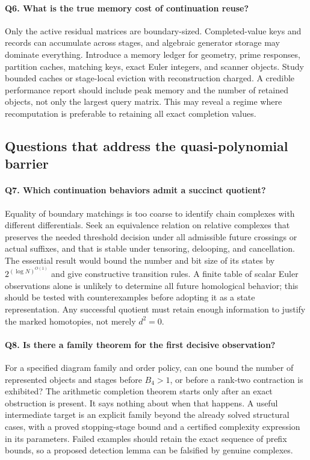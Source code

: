\paragraph{Q6. What is the true memory cost of continuation reuse?}
Only the active residual matrices are boundary-sized. Completed-value keys and
records can accumulate across stages, and algebraic generator storage may
dominate everything. Introduce a memory ledger for geometry, prime responses,
partition caches, matching keys, exact Euler integers, and scanner objects.
Study bounded caches or stage-local eviction with reconstruction charged.
A credible performance report should include peak memory and the number of
retained objects, not only the largest query matrix. This may reveal a regime
where recomputation is preferable to retaining all exact completion values.

\subsection{Questions that address the quasi-polynomial barrier}

\paragraph{Q7. Which continuation behaviors admit a succinct quotient?}
Equality of boundary matchings is too coarse to identify chain complexes with
different differentials. Seek an equivalence relation on relative complexes
that preserves the needed threshold decision under all admissible future
crossings or actual suffixes, and that is stable under tensoring, delooping,
and cancellation. The essential result would bound the number and bit size of
its states by $2^{(\log N)^{O(1)}}$ and give constructive transition rules.
A finite table of scalar Euler observations alone is unlikely to determine
all future homological behavior; this should be tested with counterexamples
before adopting it as a state representation. Any successful quotient must
retain enough information to justify the marked homotopies, not merely $d^2=0$.

\paragraph{Q8. Is there a family theorem for the first decisive observation?}
For a specified diagram family and order policy, can one bound the number of
represented objects and stages before $B_4>1$, or before a rank-two contraction
is exhibited? The arithmetic completion theorem starts only after an exact
obstruction is present. It says nothing about when that happens. A useful
intermediate target is an explicit family beyond the already solved structural
cases, with a proved stopping-stage bound and a certified complexity expression
in its parameters. Failed examples should retain the exact sequence of prefix
bounds, so a proposed detection lemma can be falsified by genuine complexes.

